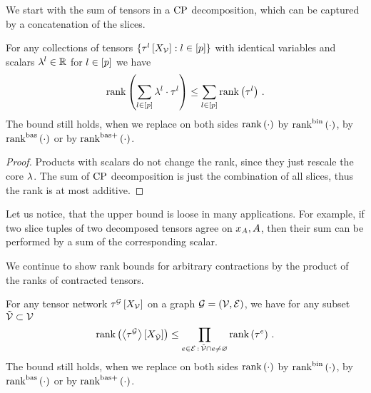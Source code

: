 
We start with the sum of tensors in a $\mathrm{CP}$ decomposition, which can be captured by a concatenation of the slices.

\begin{theorem}
    \label{the:CPrankSumBound}
    For any collections of tensors $\{\tau^{l}\left[X_{\mathcal{V}}\right] : l\in[p]\}$ with identical variables and scalars $\lambda^{l} \in \mathbb{R}$ for $l\in[p]$ we have
    \begin{align*}
        \mathrm{rank}\left(\sum_{l\in[p]} \lambda^{l} \cdot \tau^{l}\right) \leq \sum_{l\in[p]} \mathrm{rank}\left(\tau^{l}\right)  \, .
    \end{align*}
    The bound still holds, when we replace on both sides $\mathrm{rank}\left(\cdot\right)$ by $\mathrm{rank}^{\mathrm{bin}}\left(\cdot\right)$, by $\mathrm{rank}^{\mathrm{bas}}\left(\cdot\right)$ or by $\mathrm{rank}^{\mathrm{bas+}}\left(\cdot\right)$.
\end{theorem}
\begin{proof}
    Products with scalars do not change the rank, since they just rescale the core $\lambda$.
    The sum of $\mathrm{CP}$ decomposition is just the combination of all slices, thus the rank is at most additive.
\end{proof}

Let us notice, that the upper bound is loose in many applications.
For example, if two slice tuples of two decomposed tensors agree on $x_{A},A$, then their sum can be performed by a sum of the corresponding scalar.



We continue to show rank bounds for arbitrary contractions by the product of the ranks of contracted tensors.

\begin{theorem}
    \label{the:CPrankContractionBound}
    For any tensor network $\tau^{\mathcal{G}}\left[X_{\mathcal{V}}\right]$ on a graph $\mathcal{G}=(\mathcal{V},\mathcal{E})$, we have for any subset $\tilde{\mathcal{V}}\subset\mathcal{V}$
    \begin{align*}
        \mathrm{rank}\left(\left\langle \tau^{\mathcal{G}}\right\rangle \left[ X_{\tilde{\mathcal{V}}} \right]\right) \leq
        \prod_{e\in\mathcal{E} \,:\, \tilde{\mathcal{V}}\cap e \neq \varnothing} \mathrm{rank}\left(\tau^{e}\right) \, .
    \end{align*}
    The bound still holds, when we replace on both sides $\mathrm{rank}\left(\cdot\right)$ by $\mathrm{rank}^{\mathrm{bin}}\left(\cdot\right)$, by $\mathrm{rank}^{\mathrm{bas}}\left(\cdot\right)$ or by $\mathrm{rank}^{\mathrm{bas+}}\left(\cdot\right)$.
\end{theorem}

